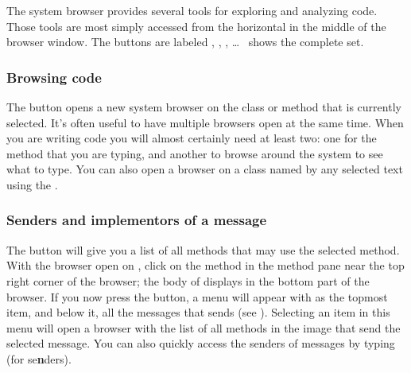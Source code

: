 \documentclass[a4paper,10pt,twoside]{book}
\begin{document}
The system browser provides several tools for exploring and analyzing code.
Those tools are most simply accessed from the horizontal  in the middle of the browser window.
The buttons are labeled , , , \ldots{}\ %
 shows the complete set.

\subsubsection{Browsing code}
\label{sec:browsing}

The  button opens a new system browser on the class or method that is currently selected.
It's often useful to have multiple browsers open at the same time.
When you are writing code you will almost certainly need at least two: one for the method that you are typing, and another to browse around the system to see what to type.
You can also open a browser on a class named by any selected text using the  .


\subsubsection{Senders and implementors of a message}
\label{sec:sendersImplementors}

The  button will give you a list of all methods that may use the selected method.
With the browser open on , click on the  method in the method pane near the top right corner of the browser; the body of  displays in the bottom part of the browser.
If you now press the  button, a menu will appear with  as the topmost item, and below it, all the messages that  sends (see ).
Selecting an item in this menu will open a browser with the list of all methods in the image that send the selected message.
You can also quickly access the senders of messages by typing  (for {se\textbf{n}ders}).
\end{document}
